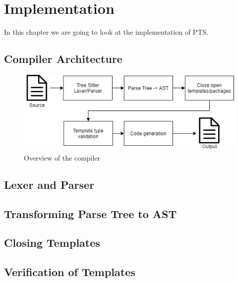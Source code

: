 
\chapter{Implementation}\label{ch:implementation}

In this chapter we are going to look at the implementation of PTS.

\section{Compiler Architecture}\label{sec:architecture}

\begin{figure}
   \centering
   \includegraphics[scale=.75]{images/Compiler overview.png}
   \caption{Overview of the compiler}
   \label{fig:compiler-overview}
\end{figure}

\section{Lexer and Parser}\label{sec:lexer-and-parser}


\section{Transforming Parse Tree to AST}\label{sec:transforming-parse-tree-to-ast}


\section{Closing Templates}\label{sec:closing-templates}


\section{Verification of Templates}\label{sec:verification-of-templates}

